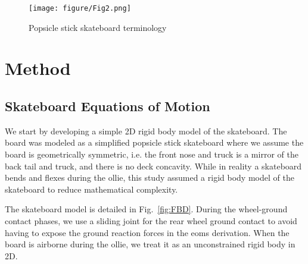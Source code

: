 \documentclass[default,iicol,pdflatex]{sn-jnl}
\begin{document}
\begin{figure}[t]
    \texttt{[image: figure/Fig2.png]}
    \caption[Skateboard terminology]{Popsicle stick skateboard terminology}
    \label{fig:skateboard terminology}
\end{figure}

\section{Method}

\subsection{Skateboard Equations of Motion}
We start by developing a simple 2D rigid body model of the skateboard.
The board was modeled as a simplified popsicle stick skateboard where we assume the board is geometrically symmetric, i.e. the front nose and truck is a mirror of the back tail and truck, and there is no deck concavity.
While in reality a skateboard bends and flexes during the ollie, this study assumed a rigid body model of the skateboard to reduce mathematical complexity.

The skateboard model is detailed in Fig.~\ref{fig:FBD}. During the wheel-ground contact phases, we use a sliding joint for the rear wheel ground contact to avoid having to expose the ground reaction forces in the \glspl{eom} derivation.
When the board is airborne during the ollie, we treat it as an unconstrained rigid body in 2D. 
\end{document}
